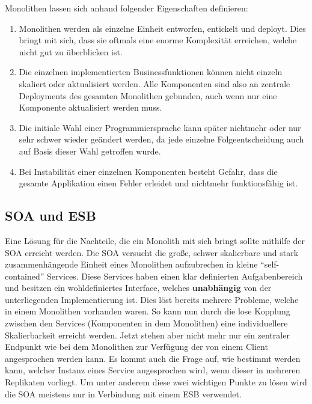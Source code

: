 \begin{definition}[Monolith]
	Monolithen lassen sich anhand folgender Eigenschaften definieren: \autocite[S. 3]{microservice_enterprise}
	\begin{enumerate}
		\item Monolithen werden als einzelne Einheit entworfen, entickelt und deployt. Dies bringt mit sich, dass sie oftmals eine enorme Komplexität erreichen, welche nicht gut zu überblicken ist.
		\item Die einzelnen implementierten Businessfunktionen können nicht einzeln skaliert oder aktualisiert werden. Alle Komponenten sind also an zentrale Deployments des gesamten Monolithen gebunden, auch wenn nur eine Komponente aktualisiert werden muss.
		\item Die initiale Wahl einer Programmiersprache kann später nichtmehr oder nur sehr schwer wieder geändert werden, da jede einzelne Folgeentscheidung auch auf Basis dieser Wahl getroffen wurde.
		\item Bei Instabilität einer einzelnen Komponenten besteht Gefahr, dass die gesamte Applikation einen Fehler erleidet und nichtmehr funktionsfähig ist.
	\end{enumerate}
\end{definition}

\subsection{SOA und ESB}

Eine Lösung für die Nachteile, die ein Monolith mit sich bringt sollte mithilfe der \ac{SOA} erreicht werden. Die \ac{SOA} versucht die große, schwer skalierbare und stark zusammenhängende Einheit eines Monolithen aufzubrechen in kleine \enquote{self-contained} Services. Diese Services haben einen klar definierten Aufgabenbereich und besitzen ein wohldefiniertes Interface, welches \textbf{unabhängig} von der unterliegenden Implementierung ist. Dies löst bereits mehrere Probleme, welche in einem Monolithen vorhanden waren. So kann nun durch die lose Kopplung zwischen den Services (Komponenten in dem Monolithen) eine individuellere Skalierbarkeit erreicht werden. Jetzt stehen aber nicht mehr nur ein zentraler Endpunkt wie bei dem Monolithen zur Verfügung der von einem Client angesprochen werden kann. Es kommt auch die Frage auf, wie bestimmt werden kann, welcher Instanz eines Service angesprochen wird, wenn dieser in mehreren Replikaten vorliegt. Um unter anderem diese zwei wichtigen Punkte zu lösen wird die \ac{SOA} meistens nur in Verbindung mit einem \ac{ESB} verwendet.

